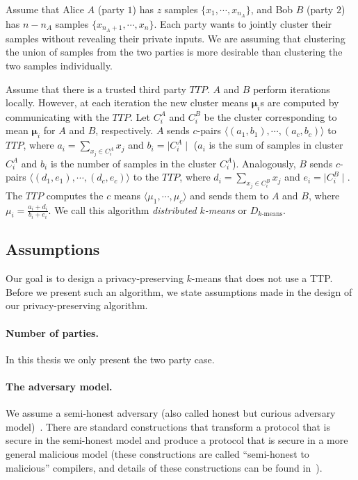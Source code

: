 Assume that Alice $A$ (party $1$) has $z$ samples $\{
x_1,\cdots,x_{n_A} \}$, and Bob $B$ (party $2$) has $n-n_A$ samples
$\{ x_{n_A + 1},\cdots,x_n \}$. Each party wants to jointly cluster
their samples without revealing their private inputs.  We are
assuming that clustering the union of samples from the two parties is
more desirable than clustering the two samples individually.

Assume that there is a trusted third party $TTP$. $A$ and $B$ perform
iterations locally. However, at each iteration the new cluster means
$\mathbf{\mu}_i$s are computed by communicating with the $TTP$. Let
$C_i^A$ and $C_i^B$ be the cluster corresponding to mean
$\mathbf{\mu}_i$ for $A$ and $B$, respectively.  $A$ sends $c$-pairs
$\langle (a_1,b_1), \cdots, (a_c,b_c) \rangle$ to $TTP$, where $a_i =
\sum_{x_j \in C_i^A } x_j$ and $b_i = \mid C_i^A \mid$ ($a_i$ is the sum of
samples in cluster $C_i^A$ and $b_i$ is the number of samples in the
cluster $C_i^A$). Analogously, $B$ sends $c$-pairs $\langle (d_1,e_1),
\cdots, (d_c,e_c) \rangle$ to the $TTP$, where $d_i = \sum_{x_j \in
C_i^B } x_j$ and $e_i = \mid C_i^B \mid$. The $TTP$ computes the $c$
means $\langle \mu_1, \cdots, \mu_c \rangle$ and sends them to $A$ and
$B$, where $\mu_i = \frac{a_i+d_i}{b_i+e_i}$. We call this algorithm
{\em distributed $k$-means} or $D_{\mbox{$k$-means}}$.

\subsection{Assumptions}

Our goal is to design a privacy-preserving $k$-means that does not
use a TTP. Before we present such an algorithm, we state assumptions
made in the design of our  privacy-preserving algorithm.

\paragraph{Number of parties.} In this thesis we only present the
two party case. 

\paragraph{The adversary model.} We assume a  semi-honest
adversary (also called honest but curious adversary model)~\cite{Goldreich:vol2}.
There are standard constructions that transform a protocol that
is secure in the semi-honest model and produce a protocol that is
secure in a more general malicious model (these constructions are
called ``semi-honest to malicious'' compilers, and details of these
constructions can be found in~\cite{Goldreich:compiler:99}).

